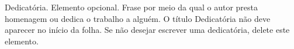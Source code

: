 \begin{dedicatoria}
   Dedicatória. Elemento opcional. Frase por meio da qual o autor presta homenagem ou dedica o trabalho a alguém. O título Dedicatória não deve aparecer no início da folha. Se não desejar escrever uma dedicatória, delete este elemento.
\end{dedicatoria}

